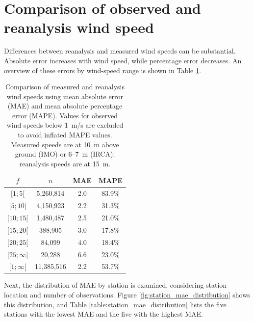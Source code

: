 \section{Comparison of observed and reanalysis wind speed}

Differences between reanalysis and measured wind speeds can be substantial. Absolute error increases with wind speed, while percentage error decreases. An overview of these errors by wind-speed range is shown in Table \ref{table:measuredVSReanalysis_wind_speed}.

\begin{table}[h]
  \centering
  \caption[Measured vs.\ reanalysis wind-speed errors]{Comparison of measured and reanalysis wind speeds using mean absolute error (MAE) and mean absolute percentage error (MAPE). Values for observed wind speeds below 1~m/s are excluded to avoid inflated MAPE values. Measured speeds are at 10~m above ground (IMO) or 6–7~m (IRCA); reanalysis speeds are at 15~m.}
  \label{table:measuredVSReanalysis_wind_speed}
  \begin{tabular}{cccc}
    \toprule
    $f$ & $n$ & MAE & MAPE \\
    \midrule
    $[1; 5[$     & 5,260,814  & 2.0 & 83.9\% \\
    $[5; 10[$    & 4,150,923  & 2.2 & 31.3\% \\
    $[10; 15[$   & 1,480,487  & 2.5 & 21.0\% \\
    $[15; 20[$   &   388,905  & 3.0 & 17.8\% \\
    $[20; 25[$   &    84,099  & 4.0 & 18.4\% \\
    $[25; \infty[$ &   20,288 & 6.6 & 23.0\% \\
    $[1; \infty[$  &11,385,516 & 2.2 & 53.7\% \\
    \bottomrule
  \end{tabular}
\end{table}

Next, the distribution of MAE by station is examined, considering station location and number of observations. Figure \ref{fig:station_mae_distribution} shows this distribution, and Table \ref{table:station_mae_distribution} lists the five stations with the lowest MAE and the five with the highest MAE.

